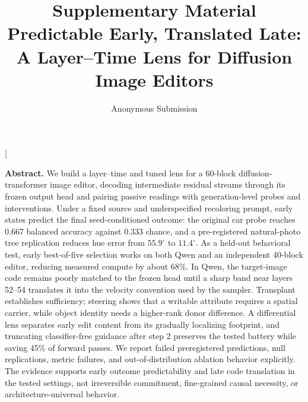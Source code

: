 \documentclass[10pt,twocolumn,letterpaper]{article}
\title{\LARGE\bf Supplementary Material\\[4pt]
\Large Predictable Early, Translated Late: A Layer--Time Lens for Diffusion Image Editors}
\author{Anonymous Submission}
\date{}
\begin{document}
\raggedbottom
\twocolumn[
  \maketitle
  \begin{center}\begin{minipage}{0.92\textwidth}
  \small
  \textbf{Abstract.}
  We build a layer--time and tuned lens for a 60-block
  diffusion-transformer image editor, decoding intermediate residual
  streams through its frozen output head and pairing passive readings
  with generation-level probes and interventions. Under a fixed source
  and underspecified recoloring prompt, early states predict the final
  seed-conditioned outcome: the original car probe reaches 0.667
  balanced accuracy against 0.333 chance, and a pre-registered
  natural-photo tree replication reduces hue error from
  $55.9^\circ$ to $11.4^\circ$. As a held-out behavioral test, early
  best-of-five selection works on both Qwen and an independent 40-block editor, reducing
  measured compute by about 68\%. In Qwen, the target-image code remains
  poorly matched to the frozen head until a sharp band near layers
  52--54 translates it into the velocity convention used by the sampler.
  Transplant establishes sufficiency; steering shows that a writable
  attribute requires a spatial carrier, while object identity needs a
  higher-rank donor difference. A differential lens separates early
  edit content from its gradually localizing footprint, and truncating
  classifier-free guidance after step 2 preserves the tested battery
  while saving 45\% of forward passes. We report failed preregistered
  predictions, null replications, metric failures, and out-of-distribution
  ablation behavior explicitly. The evidence supports early outcome
  predictability and late code translation in the tested settings, not
  irreversible commitment, fine-grained causal necessity, or
  architecture-universal behavior.
  \vspace{1.0em}
  \end{minipage}\end{center}
\end{document}
